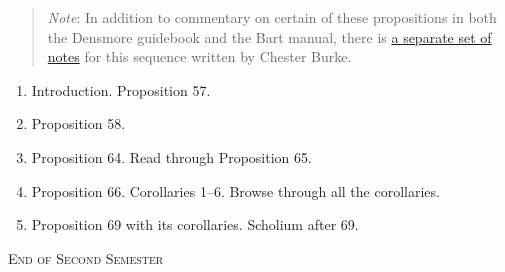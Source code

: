 \documentclass[10pt]{article}
\newcounter{includepdfpage}
\begin{document}
	\begin{quote} \small{\emph{Note}: In
			addition to commentary on certain of
			these propositions in both the
			Densmore guidebook and the Bart
			manual, there is \href{https://drive.google.com/file/d/1c0gRZDPmndb5C2JiWYSOIiMQD-mNR2cD/view?usp=sharing}{a separate set of
			notes} for this sequence written by
			Chester Burke.} \end{quote}
	\begin{enumerate}[noitemsep] \item Introduction.
			Proposition 57.  \item Proposition
			58.  \item Proposition 64. Read
			through Proposition 65.  \item
			Proposition 66. Corollaries 1--6.
			Browse through all the corollaries.
		\item Proposition 69 with its corollaries.
			Scholium after 69.  \end{enumerate}
			\bigskip
			\begin{center} \textsc{\small{End of Second Semester}} \end{center}

	\newpage \setcounter{page}{1}
	
\end{document}

